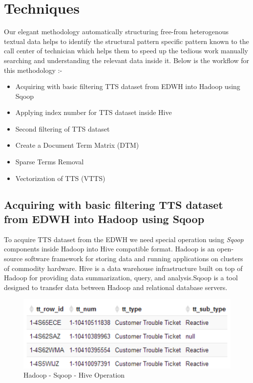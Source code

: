 \documentclass[]{article}
\providecommand{\tightlist}{%
  \setlength{\itemsep}{0pt}\setlength{\parskip}{0pt}}
\begin{document}
\pagebreak

\section{Techniques}\label{techniques}

Our elegant methodology automatically structuring free-from heterogenous
textual data helps to identify the structural pattern specific pattern
known to the call center of technician which helps them to speed up the
tedious work manually searching and understanding the relevant data
inside it. Below is the workflow for this methodology :-

\begin{itemize}
\tightlist
\item
  Acquiring with basic filtering TTS dataset from EDWH into Hadoop using
  Sqoop
\item
  Applying index number for TTS dataset inside Hive
\item
  Second filtering of TTS dataset
\item
  Create a Document Term Matrix (DTM)
\item
  Sparse Terms Removal
\item
  Vectorization of TTS (VTTS)
\end{itemize}

\subsection{Acquiring with basic filtering TTS dataset from EDWH into
Hadoop using
Sqoop}\label{acquiring-with-basic-filtering-tts-dataset-from-edwh-into-hadoop-using-sqoop}

To acquire TTS dataset from the EDWH we need special operation using
\emph{Sqoop} components inside Hadoop into Hive compatible format.
Hadoop is an open-source software framework for storing data and running
applications on clusters of commodity hardware. Hive is a data warehouse
infrastructure built on top of Hadoop for providing data summarization,
query, and analysis.Sqoop is a tool designed to transfer data between
Hadoop and relational database servers.

\begin{figure}[htbp]
\centering
\includegraphics{Journal1_files/figure-latex/unnamed-chunk-6-1.pdf}
\caption{Hadoop - Sqoop - Hive Operation}
\end{figure}
\end{document}

